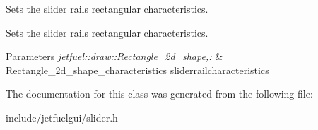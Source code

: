 Sets the slider rail\textquotesingle{}s rectangular characteristics. 

Sets the slider rail\textquotesingle{}s rectangular characteristics.


\begin{DoxyParams}{Parameters}
{\em \hyperlink{classjetfuel_1_1draw_1_1Rectangle__2d__shape}{jetfuel\+::draw\+::\+Rectangle\+\_\+2d\+\_\+shape},\+:} & Rectangle\+\_\+2d\+\_\+shape\+\_\+characteristics sliderrailcharacteristics \\
\hline
\end{DoxyParams}


The documentation for this class was generated from the following file\+:\begin{DoxyCompactItemize}
\item 
include/jetfuelgui/slider.\+h\end{DoxyCompactItemize}
